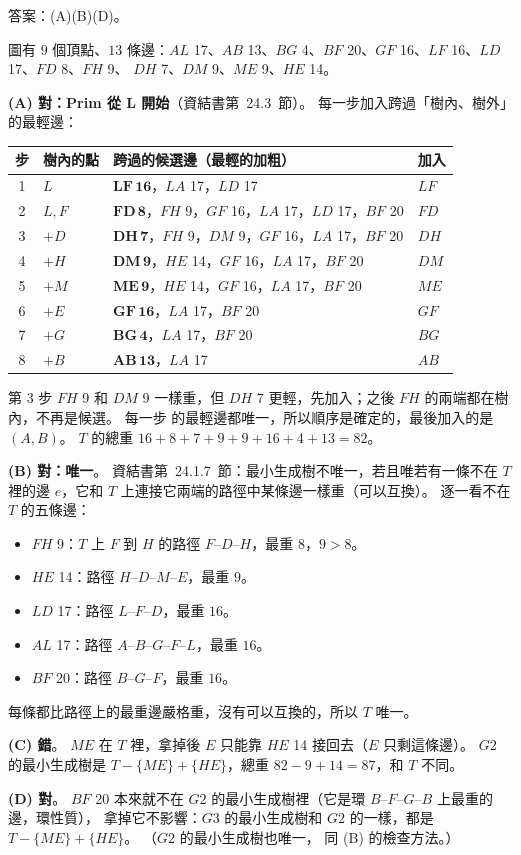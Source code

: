 \begin{pastsoln}
答案：(A)(B)(D)。

圖有 $9$ 個頂點、$13$ 條邊：$AL$ 17、$AB$ 13、$BG$ 4、$BF$ 20、$GF$ 16、$LF$ 16、$LD$ 17、$FD$ 8、$FH$ 9、
$DH$ 7、$DM$ 9、$ME$ 9、$HE$ 14。

\textbf{(A) 對：Prim 從 L 開始}（資結書第~24.3~節）。 每一步加入跨過「樹內、樹外」的最輕邊：
\begin{center}
\small
\begin{tabular}{clll}
\toprule
步 & 樹內的點 & 跨過的候選邊（最輕的加粗） & 加入 \\
\midrule
1 & $L$ & $\mathbf{LF\,16}$，$LA$ 17，$LD$ 17 & $LF$ \\
2 & $L, F$ & $\mathbf{FD\,8}$，$FH$ 9，$GF$ 16，$LA$ 17，$LD$ 17，$BF$ 20 & $FD$ \\
3 & $+D$ & $\mathbf{DH\,7}$，$FH$ 9，$DM$ 9，$GF$ 16，$LA$ 17，$BF$ 20 & $DH$ \\
4 & $+H$ & $\mathbf{DM\,9}$，$HE$ 14，$GF$ 16，$LA$ 17，$BF$ 20 & $DM$ \\
5 & $+M$ & $\mathbf{ME\,9}$，$HE$ 14，$GF$ 16，$LA$ 17，$BF$ 20 & $ME$ \\
6 & $+E$ & $\mathbf{GF\,16}$，$LA$ 17，$BF$ 20 & $GF$ \\
7 & $+G$ & $\mathbf{BG\,4}$，$LA$ 17，$BF$ 20 & $BG$ \\
8 & $+B$ & $\mathbf{AB\,13}$，$LA$ 17 & $AB$ \\
\bottomrule
\end{tabular}
\end{center}
第 $3$ 步 $FH$ 9 和 $DM$ 9 一樣重，但 $DH$ 7 更輕，先加入；之後 $FH$ 的兩端都在樹內，不再是候選。 每一步
的最輕邊都唯一，所以順序是確定的，最後加入的是 $(A, B)$。 $T$ 的總重
$16 + 8 + 7 + 9 + 9 + 16 + 4 + 13 = 82$。

\textbf{(B) 對：唯一}。 資結書第~24.1.7~節：最小生成樹不唯一，若且唯若有一條不在 $T$ 裡的邊 $e$，它和
$T$ 上連接它兩端的路徑中某條邊一樣重（可以互換）。 逐一看不在 $T$ 的五條邊：
\begin{itemize}
\item $FH$ 9：$T$ 上 $F$ 到 $H$ 的路徑 $F$--$D$--$H$，最重 $8$，$9 > 8$。
\item $HE$ 14：路徑 $H$--$D$--$M$--$E$，最重 $9$。
\item $LD$ 17：路徑 $L$--$F$--$D$，最重 $16$。
\item $AL$ 17：路徑 $A$--$B$--$G$--$F$--$L$，最重 $16$。
\item $BF$ 20：路徑 $B$--$G$--$F$，最重 $16$。
\end{itemize}
每條都比路徑上的最重邊嚴格重，沒有可以互換的，所以 $T$ 唯一。

\textbf{(C) 錯}。 $ME$ 在 $T$ 裡，拿掉後 $E$ 只能靠 $HE$ 14 接回去（$E$ 只剩這條邊）。 $G2$ 的最小生成樹是
$T - \{ME\} + \{HE\}$，總重 $82 - 9 + 14 = 87$，和 $T$ 不同。

\textbf{(D) 對}。 $BF$ 20 本來就不在 $G2$ 的最小生成樹裡（它是環 $B$--$F$--$G$--$B$ 上最重的邊，環性質），
拿掉它不影響：$G3$ 的最小生成樹和 $G2$ 的一樣，都是 $T - \{ME\} + \{HE\}$。 （$G2$ 的最小生成樹也唯一，
同 (B) 的檢查方法。）
\end{pastsoln}
